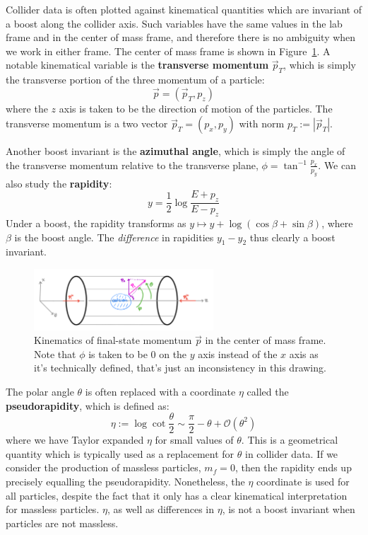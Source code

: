 \documentclass[11pt, oneside]{article}   	%
\theoremstyle{definition}
\numberwithin{equation}{subsection}		%
\begin{document}
Collider data is often plotted against kinematical quantities which are invariant of a boost along the collider axis. 
Such variables have the same values in the lab frame and in the center of mass frame, and therefore there is no ambiguity when we work in 
either frame. The center of mass frame is shown in Figure~\ref{fig:kinematics}. A notable 
kinematical variable is the \textbf{transverse momentum} $\vec p_T$, which is simply the transverse portion of the three momentum of a 
particle:
\begin{equation}
	\vec p = (\vec p_T, p_z)
\end{equation}
where the $z$ axis is taken to be the direction of motion of the particles. The transverse momentum is a two vector $\vec p_T = (p_x, p_y)$ with norm $p_T := |\vec p_T|$. 

Another boost invariant is the \textbf{azimuthal angle}, which is simply the angle of the transverse momentum 
relative to the transverse plane, $\phi = \tan^{-1}\frac{p_x}{p_y}$. We can also study the \textbf{rapidity}:
\begin{equation}
	y = \frac{1}{2}\log\frac{E + p_z}{E - p_z}
\end{equation}
Under a boost, the rapidity transforms as $y\mapsto y + \log(\cos\beta + \sin\beta)$, where $\beta$ is the boost angle. The \textit{difference} 
in rapidities $y_1 - y_2$ thus clearly a boost invariant. 

\begin{figure}[H]
	\centering
	\includegraphics[width = 0.6\textwidth]{collider_kinematics}
	\caption{Kinematics of final-state momentum $\vec p$ in the center of mass frame. Note that $\phi$ is taken to be 0 on the $y$ axis instead of the $x$ axis as it's 
	technically defined, that's just an inconsistency in this drawing.}
	\label{fig:kinematics}
\end{figure}

The polar angle $\theta$ is often replaced with a coordinate $\eta$ called the \textbf{pseudorapidity}, which is defined as:
\begin{equation}
	\eta := \log\cot\frac{\theta}{2}\sim\frac{\pi}{2} - \theta + \mathcal O(\theta^2)
\end{equation}
where we have Taylor expanded $\eta$ for small values of $\theta$. This is a geometrical quantity which is typically used as a replacement for 
$\theta$ in collider data. If we consider the production of massless particles, $m_f = 0$, then the rapidity ends up precisely equalling the 
pseudorapidity. Nonetheless, the $\eta$ coordinate is used for all particles, despite the fact that it only has a clear kinematical interpretation 
for massless particles. $\eta$, as well as differences in $\eta$, is not a boost invariant when particles are not massless. 
\end{document}
